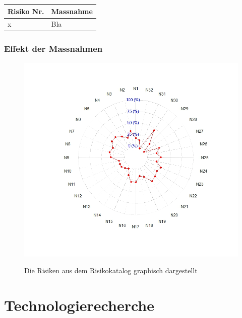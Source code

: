 \documentclass[a4paper]{report}
\begin{document}
\vspace{1em}
\noindent
\begin{tabular}{|p{}|p{}|}
	\hline
	\textbf{Risiko Nr.} & \textbf{Massnahme} \\
	\hline
	x & Bla \\
	\hline
\end{tabular}

\subsection{Effekt der Massnahmen}

\begin{figure}[h!]
	\centering
	\includegraphics[width=\textwidth,keepaspectratio]{Risikomatrix_Spinne}
	\label{fig:Risikomatrix_Spinne}
	\caption{Die Risiken aus dem Risikokatalog graphisch dargestellt}
\end{figure}

\chapter{Technologierecherche}
\end{document}

